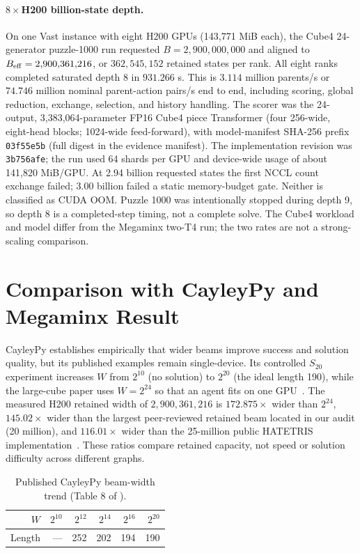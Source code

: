 \documentclass[10pt,twocolumn]{article}
\begin{document}
\paragraph{$8\times$H200 billion-state depth.}
On one Vast instance with eight H200 GPUs (143,771 MiB each), the Cube4
24-generator puzzle-1000 run requested $B=2{,}900{,}000{,}000$ and aligned to
$B_{\rm eff}=2{,}900{,}361{,}216$, or $362{,}545{,}152$ retained states per
rank. All eight ranks completed saturated depth 8 in $931.266$ s. This is
$3.114$ million parents/s or $74.746$ million nominal parent-action pairs/s
end to end, including scoring, global reduction, exchange, selection, and
history handling. The scorer was the 24-output, 3,383,064-parameter FP16 Cube4
piece Transformer (four 256-wide, eight-head blocks; 1024-wide feed-forward),
with model-manifest SHA-256 prefix \texttt{03f55e5b} (full digest in the
evidence manifest).
The implementation revision was \texttt{3b756afe}; the run used 64 shards per
GPU and device-wide usage of about 141,820 MiB/GPU. At 2.94 billion requested
states the first NCCL count exchange failed; 3.00 billion failed a static
memory-budget gate. Neither is classified as CUDA OOM. Puzzle 1000 was
intentionally stopped during depth 9, so depth 8 is a completed-step timing,
not a complete solve. The Cube4 workload and model differ from the Megaminx
two-T4 run; the two rates are not a strong-scaling comparison.

\section{Comparison with CayleyPy and Megaminx Result}
CayleyPy establishes empirically that wider beams improve success and solution
quality, but its published examples remain single-device.  Its controlled
$S_{20}$ experiment increases $W$ from $2^{10}$ (no solution) to $2^{20}$
(the ideal length 190), while the large-cube paper uses $W=2^{24}$ so that an
agent fits on one GPU~\cite{soibelman2025cayleypy,chervov2025large}. The
measured H200 retained width of $2{,}900{,}361{,}216$ is $172.875\times$
wider than $2^{24}$, $145.02\times$ wider than the largest peer-reviewed
retained beam located in our audit (20 million), and $116.01\times$ wider than
the 25-million public HATETRIS implementation~\cite{hatetrispublic}. These
ratios compare retained capacity, not speed or solution difficulty across
different graphs.

\begin{table}[t]
\centering
\small
\caption{Published CayleyPy beam-width trend (Table 8 of
\cite{soibelman2025cayleypy}).}
\label{tab:cayleypy_width}
\begin{tabular}{@{}rrrrrr@{}}
\toprule
$W$ & $2^{10}$ & $2^{12}$ & $2^{14}$ & $2^{16}$ & $2^{20}$ \\
\midrule
Length & --- & 252 & 202 & 194 & 190 \\
\bottomrule
\end{tabular}
\end{table}
\end{document}
